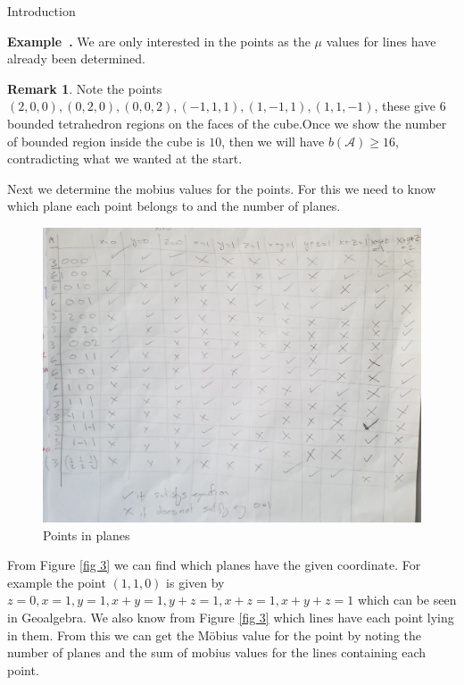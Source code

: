 \documentclass[a4paper,12pt]{article}
\newcounter{example}[]
\newenvironment{example}[1][]{\refstepcounter{example}\par\medskip
   \noindent \textbf{Example~\theexample. #1} \rmfamily}{\medskip}
\theoremstyle{definition}
\theoremstyle{indented}
\newtheorem*{remark}{Remark}
\begin{document}
\begin{section}{Introduction}
\begin{example}
We are only interested in the points as the $\mu$ values for lines have already been determined. 


\begin{remark} Note the points $(2,0,0), (0,2,0), (0,0,2), (-1,1,1),(1,-1,1) ,(1,1,-1)$, these give $6$ bounded tetrahedron regions on the faces of the cube.Once we show the number of bounded region inside the cube is $10$, then we will have $b(\mathcal{A}) \ge 16$, contradicting what we wanted at the start.
\end{remark}


Next we determine the mobius values for the points. For this we need to know which plane each point belongs to and the number of planes. 

\begin{figure}[H]
    \centering
 \includegraphics[scale=0.10,angle=0]{29072020 pics/Pointsplane.jpg}  
    \caption{Points in planes}
    \label{pointsplanes}
\end{figure}


 From Figure \ref{fig 3} we can find which planes have the given coordinate. For example the point $(1,1,0)$ is given by $z=0, x=1, y=1, x+y=1,y+z=1, x+z=1, x+y+z=1$ which can be seen in Geoalgebra. We also know from Figure \ref{fig 3} which lines have each point lying in them. From this we can get the Möbius value for the point by noting the number of planes and the sum of mobius values for the lines containing each point. 
 
\medskip


\end{example}
\end{section}
\end{document}
